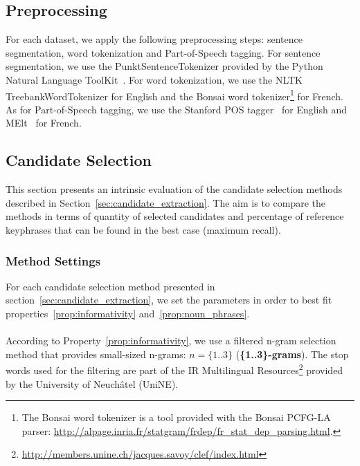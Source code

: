   \subsection{Preprocessing}
  \label{subsec:preprocessing}
    For each dataset, we apply the following preprocessing steps: sentence
    segmentation, word tokenization and Part-of-Speech tagging. For sentence
    segmentation, we use the PunktSentenceTokenizer provided by the Python
    Natural Language ToolKit~\cite[NLTK]{bird2009nltk}. For word tokenization,
    we use the NLTK TreebankWordTokenizer for English and the Bonsai word
    tokenizer\footnote{The Bonsai word tokenizer is a tool provided with the
    Bonsai PCFG-LA parser:
    \url{http://alpage.inria.fr/statgram/frdep/fr_stat_dep_parsing.html}.} for
    French. As for Part-of-Speech tagging, we use the Stanford
    POS tagger~\cite{toutanova2003stanfordpostagger} for English and
    MElt~\cite{denis2009melt} for French.

  \subsection{Candidate Selection}
  \label{subsec:candidate_extraction}

    This section presents an intrinsic evaluation of the candidate selection
    methods described in Section~\ref{sec:candidate_extraction}. The aim is to
    compare the methods in terms of quantity of selected candidates and
    percentage of reference keyphrases that can be found in the best case
    (maximum recall).

    \subsubsection{Method Settings}
    \label{subsubsec:method_settings}
      For each candidate selection method presented in
      section~\ref{sec:candidate_extraction}, we set the parameters in order to
      best fit  properties~\ref{prop:informativity}
      and~\ref{prop:noun_phrases}.

      \paragraph{}
      According to Property~\ref{prop:informativity}, we use a filtered n-gram
      selection method that provides small-sized n-grams: $n = \{1..3\}$
      (\textbf{\{1..3\}-grams}). The stop words used for the filtering are part
      of the IR Multilingual
      Resources\footnote{\url{http://members.unine.ch/jacques.savoy/clef/index.html}}
      provided by the University of Neuchâtel (UniNE).

